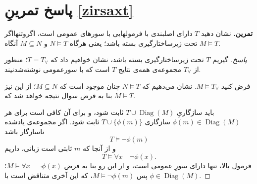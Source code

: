 \documentclass[12pt,a4paper]{report}
\theoremstyle{colorhead}
\DeclareMathOperator{\diag}{Diag}
\begin{document}
\section{پاسخ تمرینِ
\ref{zirsaxt}}
\textbf{تمرین.}
نشان دهید 
$T$
دارای اصلبندی با فرمولهایی با سورهای عمومی است، اگروتنهااگر تحت زیرساختارگیری بسته باشد؛ یعنی
هرگاه
$N\models T$
و
$M\subseteq N$
آنگاه
$M\models T$.
\begin{proof}[پاسخ]
گیریم 
$T$
تحت زیرساختارگیری بسته باشد، نشان خواهیم داد که
$T=T_\forall$؛
منظور از
$T_\forall$
مجموعه‌ی همه‌ی نتایج $T$
است که با سورعمومی نوشته‌شدنیند.
\par 
فرض کنید
$M\models T_\forall$.
نشان می‌دهیم که
$N\models T$
چنان موجود است که
$M\subseteq N$؛
از این نیز بنا به فرض سوال نتیجه خواهد شد که
$M\models T$.
\par 
باید سازگاریِ
$T\cup \diag(M)$
ثابت شود، و برای آن کافی است برای هر
$\phi(m)\in \diag(M)$
سازگاری 
$T\cup \{\phi(m)\}$
ثابت شود. اگر مجموعه‌ی یادشده ناسازگار باشد
\[
T\models \neg \phi(m)
\]
و از آنجا که
$m$
ثابتی است زبانی، داریم
\[
T\models \forall x \quad \neg \phi(x).
\]
فرمول بالا، تنها دارای سورِ عمومی است، و از این رو بنا به فرض
$M\models \forall x\quad \neg \phi(x)$؛
پس
$M\models \neg \phi(m)$،
که این آخری متناقض است با 
$\phi\in \diag(M)$.
\end{proof}
\pagebreak
\end{document}
